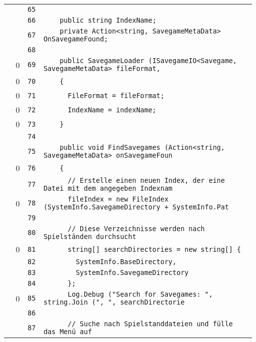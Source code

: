 \documentclass[a4paper,10pt]{article}
\begin{document}
\begin{longtable}[l]{lrrl}
\cellcolor{gray} &  & \verb~65~ & \verb~~\\
\cellcolor{gray} &  & \verb~66~ & \verb~    public string IndexName;~\\
\cellcolor{gray} &  & \verb~67~ & \verb~    private Action<string, SavegameMetaData> OnSavegameFound;~\\
\cellcolor{gray} &  & \verb~68~ & \verb~~\\
\cellcolor{red} & 0 & \verb~69~ & \verb~    public SavegameLoader (ISavegameIO<Savegame, SavegameMetaData> fileFormat,~\\
\cellcolor{red} & 0 & \verb~70~ & \verb~    {~\\
\cellcolor{red} & 0 & \verb~71~ & \verb~      FileFormat = fileFormat;~\\
\cellcolor{red} & 0 & \verb~72~ & \verb~      IndexName = indexName;~\\
\cellcolor{red} & 0 & \verb~73~ & \verb~    }~\\
\cellcolor{gray} &  & \verb~74~ & \verb~~\\
\cellcolor{gray} &  & \verb~75~ & \verb~    public void FindSavegames (Action<string, SavegameMetaData> onSavegameFoun~\\
\cellcolor{red} & 0 & \verb~76~ & \verb~    {~\\
\cellcolor{gray} &  & \verb~77~ & \verb~      // Erstelle einen neuen Index, der eine Datei mit dem angegeben Indexnam~\\
\cellcolor{red} & 0 & \verb~78~ & \verb~      fileIndex = new FileIndex (SystemInfo.SavegameDirectory + SystemInfo.Pat~\\
\cellcolor{gray} &  & \verb~79~ & \verb~~\\
\cellcolor{gray} &  & \verb~80~ & \verb~      // Diese Verzeichnisse werden nach Spielständen durchsucht~\\
\cellcolor{red} & 0 & \verb~81~ & \verb~      string[] searchDirectories = new string[] {~\\
\cellcolor{gray} &  & \verb~82~ & \verb~        SystemInfo.BaseDirectory,~\\
\cellcolor{gray} &  & \verb~83~ & \verb~        SystemInfo.SavegameDirectory~\\
\cellcolor{gray} &  & \verb~84~ & \verb~      };~\\
\cellcolor{red} & 0 & \verb~85~ & \verb~      Log.Debug ("Search for Savegames: ", string.Join (", ", searchDirectorie~\\
\cellcolor{gray} &  & \verb~86~ & \verb~~\\
\cellcolor{gray} &  & \verb~87~ & \verb~      // Suche nach Spielstanddateien und fülle das Menü auf~\\

\end{longtable}
\end{document}
